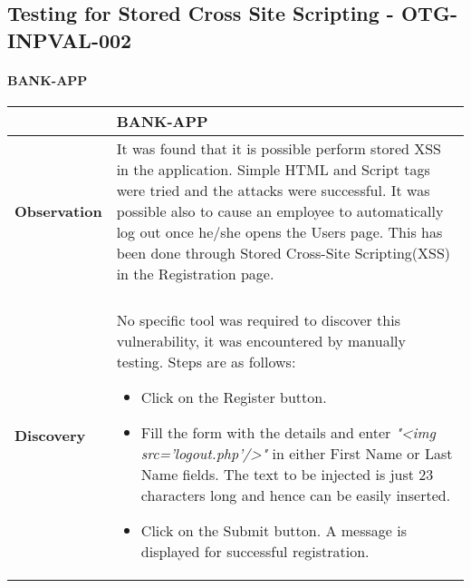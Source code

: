 \subsection{Testing for Stored Cross Site Scripting - OTG-INPVAL-002} \label{OTG-INPVAL-002}

\paragraph{BANK-APP} \mbox{}
\begin{longtable*}{p{.30\textwidth} | p{.70\textwidth}}
    \hline
    & \textbf{BANK-APP} \\
    \hline
    \textbf{Observation} &
       It was found that it is possible perform stored XSS in the application. Simple HTML and Script tags were tried and the attacks were successful.
       It was possible also to cause an employee to automatically log out once he/she opens the Users page. This has been done through Stored Cross-Site Scripting(XSS) in the Registration page.
    \\\\
    \textbf{Discovery} &
      No specific tool was required to discover this vulnerability, it was encountered by manually testing. Steps are as follows:
       \begin{itemize}
	       \item Click on the Register button.

	       \item Fill the form with the details and enter \textit{"<img src='logout.php'/>"} in either First Name or Last Name fields. The text to be injected is just 23 characters long and hence can be easily inserted.

	       \item Click on the Submit button. A message is displayed for successful registration.


\end{itemize}
\end{longtable*}
